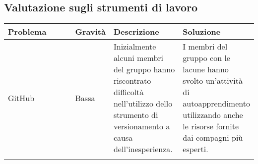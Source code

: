 \subsection{Valutazione sugli strumenti di lavoro}
    \begin{table}[H]
        \centering
        \begin{tabular}{|p{0.3\linewidth}|p{0.11\linewidth}|p{0.29\linewidth}|p{0.3\linewidth}|}
        \hline
        \rowcolor[HTML]{036400}
        {\color[HTML]{FFFFFF} \textbf{Problema}} & {\color[HTML]{FFFFFF} \textbf{Gravità}} & {\color[HTML]{FFFFFF} \textbf{Descrizione}} & {\color[HTML]{FFFFFF} \textbf{Soluzione}} \\ \hline
        \rowcolor[HTML]{EFEFEF}
        GitHub& Bassa & Inizialmente alcuni membri del gruppo hanno riscontrato difficoltà nell'utilizzo dello strumento di versionamento a causa dell'inesperienza. & I membri del gruppo con le lacune hanno svolto un'attività di autoapprendimento utilizzando anche le risorse fornite dai compagni più esperti. \\ \hline
        \rowcolor[HTML]{C0C0C0}
        \end{tabular}
    \end{table}